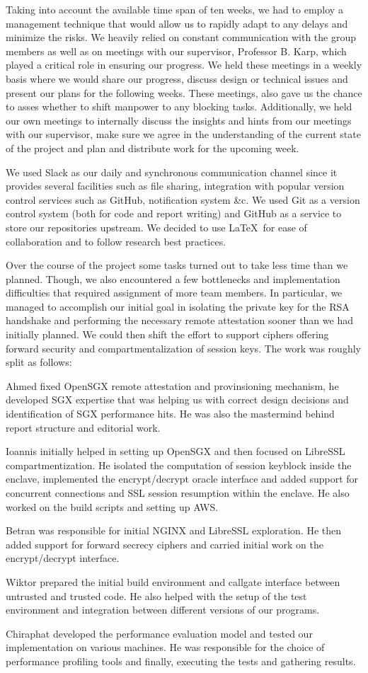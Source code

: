 \documentclass[../main.tex]{subfiles}
\begin{document}
Taking into account the available time span of ten weeks, we had to employ a
management technique that would allow us to rapidly adapt to any delays and
minimize the risks. We heavily relied on constant communication with the group
members as well as on meetings with our supervisor, Professor B. Karp, which
played a critical role in ensuring our progress. We held these meetings in a
weekly basis where we would share our progress, discuss design or technical
issues and present our plans for the following weeks. These meetings, also gave
us the chance to asses whether to shift manpower to any blocking tasks.
Additionally, we held our own meetings to internally discuss the insights and
hints from our meetings with our supervisor, make sure we agree in the
understanding of the current state of the project and plan and distribute work
for the upcoming week.

We used Slack as our daily and synchronous communication channel since it
provides several facilities such as file sharing, integration with popular
version control services such as GitHub, notification system \&c. We used
Git as a version control system (both for code and report writing) and GitHub
as a service to store our repositories upstream. We decided to use \LaTeX~for
ease of collaboration and to follow research best practices.

Over the course of the project some tasks turned out to take less time than we
planned. Though, we also encountered a few bottlenecks and implementation
difficulties that required assignment of more team members. In particular, we
managed to accomplish our initial goal in isolating the private key for the RSA
handshake and performing the necessary remote attestation sooner than we had
initially planned. We could then shift the effort to support ciphers offering
forward security and compartmentalization of session keys. The work was roughly
split as follows:

Ahmed fixed OpenSGX remote attestation and provinsioning mechanism, he
developed SGX expertise that was helping us with correct design decisions and
identification of SGX performance hits. He was also the mastermind behind
report structure and editorial work.

Ioannis initially helped in setting up OpenSGX and then focused on LibreSSL
compartmentization. He isolated the computation of session keyblock inside the
enclave, implemented the encrypt/decrypt oracle interface and added support
for concurrent connections and SSL session resumption within the enclave. He
also worked on the build scripts and setting up AWS.

Betran was responsible for initial NGINX and LibreSSL exploration. He then
added support for forward secrecy ciphers and carried initial work on the
encrypt/decrypt interface.

Wiktor prepared the initial build environment and callgate interface between
untrusted and trusted code. He also helped with the setup of the test
environment and integration between different versions of our programs.

Chiraphat developed the performance evaluation model and tested our
implementation on various machines. He was responsible for the choice of
performance profiling tools and finally, executing the tests and gathering
results.
\end{document}
